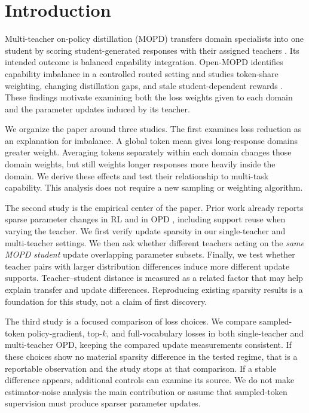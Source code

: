 \section{Introduction}
\label{sec:intro}

Multi-teacher on-policy distillation (MOPD) transfers domain specialists
into one student by scoring student-generated responses with their
assigned teachers \citep{ma2026mopdmultiteacheronpolicydistillation}.
Its intended outcome is balanced capability integration. Open-MOPD
identifies capability imbalance in a controlled routed setting and
studies token-share weighting, changing distillation gaps, and stale
student-dependent rewards \citep{gao2026openmopddiagnosingfixingcapability}.
These findings motivate examining both the loss weights given to each
domain and the parameter updates induced by its teacher.

We organize the paper around three studies. The first examines loss
reduction as an explanation for imbalance. A global token mean gives
long-response domains greater weight. Averaging tokens separately within
each domain changes those domain weights, but still weights longer
responses more heavily inside the domain. We derive these effects and
test their relationship to multi-task capability. This analysis does
not require a new sampling or weighting algorithm.

The second study is the empirical center of the paper. Prior work
already reports sparse parameter changes in RL
\citep{mukherjee2025subnetworks} and in OPD
\citep{yu2026denseupdates,shen2026opdgeometry}, including support reuse
when varying the teacher. We first verify update sparsity in our
single-teacher and multi-teacher settings. We then ask whether different
teachers acting on the \emph{same MOPD student} update overlapping
parameter subsets. Finally, we test whether teacher pairs with larger
distribution differences induce more different update supports.
Teacher--student distance is measured as a related factor that may help
explain transfer and update differences. Reproducing existing sparsity
results is a foundation for this study, not a claim of first discovery.

The third study is a focused comparison of loss choices. We compare
sampled-token policy-gradient, top-$k$, and full-vocabulary losses in
both single-teacher and multi-teacher OPD, keeping the compared
update measurements consistent. If these choices
show no material sparsity difference in the tested regime, that is a
reportable observation and the study stops at that comparison. If a
stable difference appears, additional controls can examine its source.
We do not make estimator-noise analysis the main contribution or assume
that sampled-token supervision must produce sparser parameter updates.

